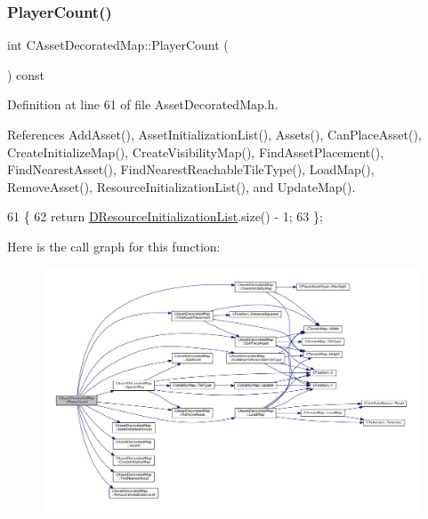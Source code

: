 \subsubsection{\texorpdfstring{Player\+Count()}{PlayerCount()}}
{\footnotesize\ttfamily int C\+Asset\+Decorated\+Map\+::\+Player\+Count (\begin{DoxyParamCaption}{ }\end{DoxyParamCaption}) const\hspace{0.3cm}{\ttfamily [inline]}}



Definition at line 61 of file Asset\+Decorated\+Map.\+h.



References Add\+Asset(), Asset\+Initialization\+List(), Assets(), Can\+Place\+Asset(), Create\+Initialize\+Map(), Create\+Visibility\+Map(), Find\+Asset\+Placement(), Find\+Nearest\+Asset(), Find\+Nearest\+Reachable\+Tile\+Type(), Load\+Map(), Remove\+Asset(), Resource\+Initialization\+List(), and Update\+Map().


\begin{DoxyCode}
61                                \{
62              \textcolor{keywordflow}{return} \hyperlink{classCAssetDecoratedMap_ab4c78aeb90280ea98a3aa542cdb7f8cc}{DResourceInitializationList}.size() - 1;
63         \};
\end{DoxyCode}
Here is the call graph for this function\+:\nopagebreak
\begin{figure}[H]
\begin{center}
\leavevmode
\includegraphics[width=350pt]{classCAssetDecoratedMap_a1ead2938a9585fa82b5b5ef72efe6eba_cgraph}
\end{center}
\end{figure}
\hypertarget{classCAssetDecoratedMap_a77f46be1ceb30bb83fc3f35c0d58a9a7}{}\label{classCAssetDecoratedMap_a77f46be1ceb30bb83fc3f35c0d58a9a7} 
